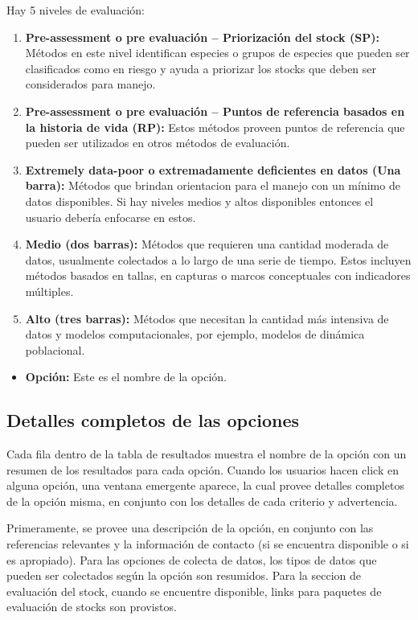 \documentclass[
  11pt,
]{book}
\providecommand{\tightlist}{%
  \setlength{\itemsep}{0pt}\setlength{\parskip}{0pt}}
\begin{document}
Hay 5 niveles de evaluación:

\begin{enumerate}
\def\labelenumi{\alph{enumi}.}
\item
  \textbf{Pre-assessment o pre evaluación -- Priorización del stock (SP):} Métodos en este nivel identifican especies o grupos de especies que pueden ser clasificados como en riesgo y ayuda a priorizar los stocks que deben ser considerados para manejo.
\item
  \textbf{Pre-assessment o pre evaluación -- Puntos de referencia basados en la historia de vida (RP):} Estos métodos proveen puntos de referencia que pueden ser utilizados en otros métodos de evaluación.
\item
  \textbf{Extremely data-poor o extremadamente deficientes en datos (Una barra):} Métodos que brindan orientacion para el manejo con un mínimo de datos disponibles. Si hay niveles medios y altos disponibles entonces el usuario debería enfocarse en estos.
\item
  \textbf{Medio (dos barras):} Métodos que requieren una cantidad moderada de datos, usualmente colectados a lo largo de una serie de tiempo. Estos incluyen métodos basados en tallas, en capturas o marcos conceptuales con indicadores múltiples.
\item
  \textbf{Alto (tres barras):} Métodos que necesitan la cantidad más intensiva de datos y modelos computacionales, por ejemplo, modelos de dinámica poblacional.
\end{enumerate}

\begin{itemize}
\tightlist
\item
  \textbf{Opción:} Este es el nombre de la opción.
\end{itemize}

\hypertarget{detalles-completos-de-las-opciones}{%
\subsection{Detalles completos de las opciones}\label{detalles-completos-de-las-opciones}}

Cada fila dentro de la tabla de resultados muestra el nombre de la opción con un resumen de los resultados para cada opción. Cuando los usuarios hacen click en alguna opción, una ventana emergente aparece, la cual provee detalles completos de la opción misma, en conjunto con los detalles de cada criterio y advertencia.

Primeramente, se provee una descripción de la opción, en conjunto con las referencias relevantes y la información de contacto (si se encuentra disponible o si es apropiado). Para las opciones de colecta de datos, los tipos de datos que pueden ser colectados según la opción son resumidos. Para la seccion de evaluación del stock, cuando se encuentre disponible, links para paquetes de evaluación de stocks son provistos.
\end{document}
